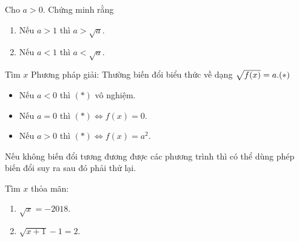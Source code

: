 \begin{vd}
	Cho $a>0$. Chứng minh rằng 
	\begin{multicols}{2}
		\begin{enumerate}
			\item Nếu $a>1$ thì $a>\sqrt{a}$.
			\item Nếu $a<1$ thì $a<\sqrt{a}$.
		\end{enumerate}
	\end{multicols}
\end{vd}

\begin{dang}{Tìm $x$}
	Phương pháp giải: Thường biến đổi  biểu thức về dạng $\sqrt{f(x)}=a. \hfill(*)$
	\begin{itemize}
		\item Nếu $a<0$ thì $(*)$ vô nghiệm.
		\item Nếu $a=0$ thì $(*)\Leftrightarrow f(x)=0$.
		\item Nếu $a>0$ thì $(*) \Leftrightarrow f(x)=a^2$.
	\end{itemize}
	\begin{note}
		Nếu không biến đổi tương đương được các phương trình thì có thể dùng phép biến đổi suy ra sau đó phải thử lại.
	\end{note}
\end{dang}
\begin{vd}
	Tìm $x$ thỏa mãn:
	\begin{multicols}{2}
		\begin{enumerate}
			\item $\sqrt{x}=-2018$.
			\item $\sqrt{x+1}-1=2$.
		\end{enumerate} 
	\end{multicols}    
\end{vd}


